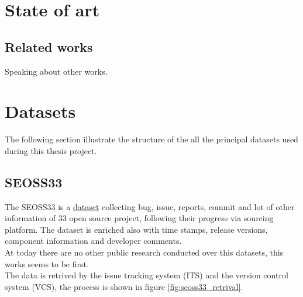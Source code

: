 \documentclass[%
    corpo=12pt,
    twoside,
    oldstyle,
    autoretitolo,
    greek,
    evenboxes,
]{toptesi}
\begin{document}
\chapter{State of art}
\section{Related works}
Speaking about other works.


\chapter{Datasets}
\label{chap:dataset}
The following section illustrate the structure of the all the principal datasets used during this thesis project.
\section{SEOSS33}
The SEOSS33\cite{SEOSS33} is a \href{https://doi.org/10.7910/DVN/PDDZ4Q}{dataset} collecting bug, issue, reports, commit and lot of other information of 33 open source project, following their progress via sourcing platform. The dataset is enriched also with time stamps, release versions, component information and developer comments.\\
At today there are no other public research conducted over this datasets, this works seems to be first.\\
The data is retrived by the issue tracking system (ITS) and the version control system (VCS), the process is shown in figure \ref{fig:seoss33_retrival}.
\end{document}
